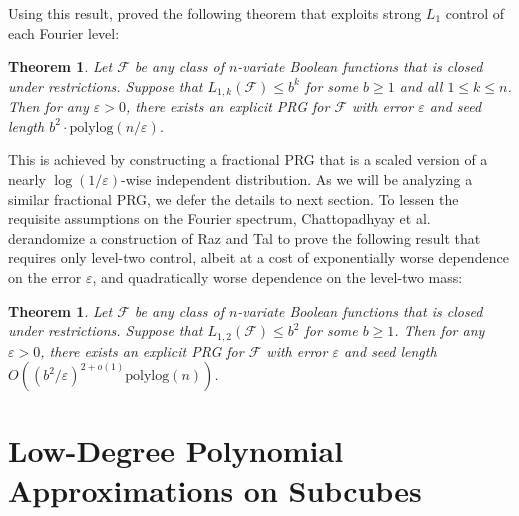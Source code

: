 \documentclass[10pt,a4paper]{article}
\newcommand{\eps}{\varepsilon}
\newtheorem{THM}[theorem]{Theorem}
\theoremstyle{definition}
\begin{document}
Using this result, \cite{CHHL} proved the following theorem that exploits strong $L_1$ control of each Fourier level:

\begin{THM}
\label{thm:chhl}
Let $\mathcal{F}$ be any class of $n$-variate Boolean functions that is closed under restrictions. Suppose that $L_{1,k}(\mathcal{F})\leq b^k$ for some $b\geq 1$ and all $1\leq k\leq n$. Then for any $\eps>0$, there exists an explicit PRG for $\mathcal{F}$ with error $\eps$ and seed length $b^2\cdot\mathrm{polylog}(n/\eps)$.
\end{THM}

This is achieved by constructing a fractional PRG that is a scaled version of a nearly $\log(1/\eps)$-wise independent distribution. As we will be analyzing a similar fractional PRG, we defer the details to next section. To lessen the requisite assumptions on the Fourier spectrum, Chattopadhyay {et al.} \cite{CHLT} derandomize a construction of Raz and Tal \cite{RazTal} to prove the following result that requires only level-two control, albeit at a cost of exponentially worse dependence on the error $\eps$, and quadratically worse dependence on the level-two mass:

\begin{THM}
\label{thm:chlt}
Let $\mathcal{F}$ be any class of $n$-variate Boolean functions that is closed under restrictions. Suppose that $L_{1,2}(\mathcal{F})\leq b^2$ for some $b\geq 1$. Then for any $\eps>0$, there exists an explicit PRG for $\mathcal{F}$ with error $\eps$ and seed length $O((b^2/\eps)^{2+o(1)}\mathrm{polylog}(n))$.
\end{THM}



\section{Low-Degree Polynomial Approximations on Subcubes}
\label{sec:lowdeg}
\end{document}
